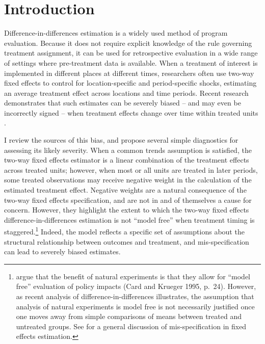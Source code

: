 \documentclass[11pt]{article}
\begin{document}
\addtocounter{page}{1}

\doublespacing

\section{Introduction}

Difference-in-differences estimation is a widely used method of program 
evaluation.  Because it does not require explicit knowledge of the 
rule governing treatment assignment, it can be used for retrospective evaluation in a wide range of settings where pre-treatment data is available.  When a treatment of interest is implemented 
in different places at different times, researchers often use two-way fixed effects to control for location-specific and period-specific shocks, estimating an average treatment effect across locations and time periods.  Recent research demonstrates that such estimates can be severely biased -- and may even be incorrectly signed -- when treatment effects change over time within treated units \cite{GoodmanBacon2020,Chaisemartin2020}. 

I review the sources of this bias, and propose several simple diagnostics for assessing its likely severity.  
When a common trends assumption is satisfied, the two-way fixed effects estimator is a linear combination of the treatment effects across treated units; however, when most or all units are treated in later periods, some treated observations may receive negative weight in the calculation of the estimated treatment effect. 
Negative weights are a natural consequence of the two-way fixed effects specification, and are not in and of themselves a cause for concern.  However, they highlight the extent to which the two-way fixed effects difference-in-differences estimation is not ``model free'' when treatment timing is staggered.\footnote{ argue that the benefit of natural experiments is that they allow for ``model free'' evaluation of policy impacts (Card and Krueger 1995, p.~24).  However, as recent analysis of difference-in-differences illustrates, the assumption that analysis of natural experiments is model free is not necessarily justified once one moves away from simple comparisons of means between treated and untreated groups.  See  for a general discussion of mis-specification in fixed effects estimation.}  Indeed, the model reflects a specific set of assumptions about the structural relationship between outcomes and treatment, and mis-specification can lead to severely biased estimates.  
\end{document}
